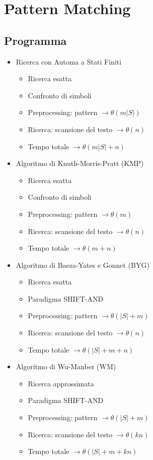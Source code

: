 \chapter{Pattern Matching}

\section{Programma}

\begin{itemize}
    \item Ricerca con Automa a Stati Finiti
    \begin{itemize}
        \item Ricerca esatta
        \item Confronto di simboli
        \item Preprocessing: pattern $\rightarrow \theta(m|S|)$
        \item Ricerca: scansione del testo $\rightarrow \theta(n)$
        \item Tempo totale $\rightarrow \theta(m|S|+n)$
    \end{itemize}

    \item Algoritmo di Knuth-Morris-Pratt (KMP)
    \begin{itemize}
        \item Ricerca esatta
        \item Confronto di simboli
        \item Preprocessing: pattern $\rightarrow \theta(m)$
        \item Ricerca: scansione del testo $\rightarrow \theta(n)$
        \item Tempo totale $\rightarrow \theta(m+n)$
    \end{itemize}

    \item Algoritmo di Baeza-Yates e Gonnet (BYG)
    \begin{itemize}
        \item Ricerca esatta
        \item Paradigma SHIFT-AND
        \item Preprocessing: pattern $\rightarrow \theta(|S|+m)$
        \item Ricerca: scansione del testo $\rightarrow \theta(n)$
        \item Tempo totale $\rightarrow \theta(|S|+m+n)$
    \end{itemize}

    \item Algoritmo di Wu-Manber (WM)
    \begin{itemize}
        \item Ricerca approssimata
        \item Paradigma SHIFT-AND
        \item Preprocessing: pattern $\rightarrow \theta(|S|+m)$
        \item Ricerca: scansione del testo $\rightarrow \theta(kn)$
        \item Tempo totale $\rightarrow \theta(|S|+m+kn)$
    \end{itemize}


\end{itemize}
